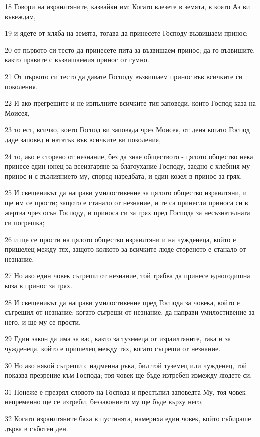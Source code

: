 \par 18 Говори на израилтяните, казвайки им: Когато влезете в земята, в която Аз ви въвеждам,
\par 19 и ядете от хляба на земята, тогава да принесете Господу възвишаем принос;
\par 20 от първото си тесто да принесете пита за възвишаем принос; да го възвишите, както правите с възвишаемия принос от гумно.
\par 21 От първото си тесто да давате Господу възвишаем принос във всичките си поколения.
\par 22 И ако прегрешите и не изпълните всичките тия заповеди, които Господ каза на Моисея,
\par 23 то ест, всичко, което Господ ви заповяда чрез Моисея, от деня когато Господ даде заповед и нататък във всичките ви поколения,
\par 24 то, ако е сторено от незнание, без да знае обществото - цялото общество нека принесе един юнец за всеизгаряне за благоухание Господу, заедно с хлебния му принос и с възлиянието му, според наредбата, и един козел в принос за грях.
\par 25 И свещеникът да направи умилостивение за цялото общество израилтяни, и ще им се прости; защото е станало от незнание, и те са принесли приноса си в жертва чрез огън Господу, и приноса си за грях пред Господа за несъзнателната си погрешка;
\par 26 и ще се прости на цялото общество израилтяни и на чужденеца, който е пришелец между тях, защото колкото за всичките люде стореното е станало от незнание.
\par 27 Но ако един човек съгреши от незнание, той трябва да принесе едногодишна коза в принос за грях.
\par 28 И свещеникът да направи умилостивение пред Господа за човека, който е съгрешил от незнание; когато съгреши от незнание, да направи умилостивение за него, и ще му се прости.
\par 29 Един закон да има за вас, както за туземеца от израилтяните, така и за чужденеца, който е пришелец между тях, когато съгреши от незнание.
\par 30 Но ако някой съгреши с надменна ръка, бил той туземец или чужденец, той показва презрение към Господа; тоя човек ще бъде изтребен измежду людете си.
\par 31 Понеже е презрял словото на Господа и престъпил заповедта Му, тоя човек непременно ще се изтреби, беззаконието му ще бъде върху него.
\par 32 Когато израилтяните бяха в пустинята, намериха един човек, който събираше дърва в съботен ден.
